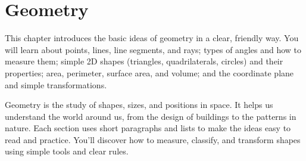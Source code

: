 \newpage
\chapter{Geometry}

This chapter introduces the basic ideas of geometry in a clear, friendly way. 
You will learn about points, lines, line segments, and rays; types of angles 
and how to measure them; simple 2D shapes (triangles, quadrilaterals, circles) 
and their properties; area, perimeter, surface area, and volume; and the 
coordinate plane and simple transformations.

Geometry is the study of shapes, sizes, and positions in space. It helps us 
understand the world around us, from the design of buildings to the patterns 
in nature. Each section uses short paragraphs and lists to make the ideas 
easy to read and practice. You'll discover how to measure, classify, and 
transform shapes using simple tools and clear rules.


% 
% 
% 
% 
% 
% 
% 